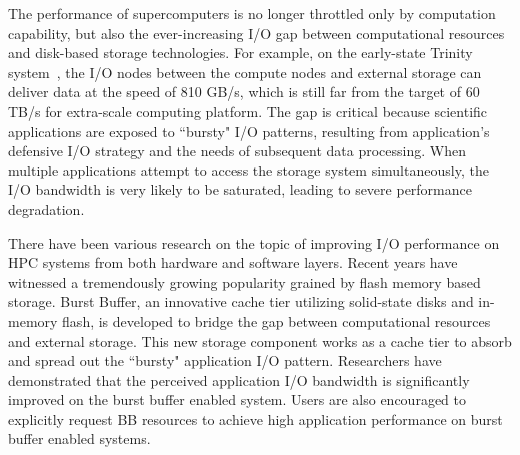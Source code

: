 The performance of supercomputers is no longer throttled only by computation capability,
but also the ever-increasing I/O gap
between computational resources and disk-based storage technologies.
For example, on the early-state Trinity system~\cite{TrinitySystem}, the I/O nodes between
the compute nodes and external storage can deliver data at  the speed of 810 GB/s, 
which is still far from the target of 60 TB/s for extra-scale computing platform\cite{Shalf:HPCCS:2010}.
The gap is critical because scientific applications are exposed to
``bursty" I/O patterns\cite{Carns:MSST:2011, Kim:PDSW:2010},
resulting from application's
defensive I/O strategy\cite{Latham:CSD:2012, Naik:ICPPW:2009, Dennis:CUG:2009}
and the needs of subsequent data processing.
When multiple applications attempt to access the storage system simultaneously,
the I/O bandwidth is very likely to be saturated, leading to severe performance degradation.


There have been various research on the topic of improving I/O performance on HPC systems from
both hardware and software layers.
Recent years have witnessed a tremendously growing popularity grained by flash memory  based storage.
Burst Buffer, an innovative cache tier utilizing solid-state disks and in-memory flash, 
is developed to bridge the gap between computational resources and external storage.
This new storage component works as a cache tier to absorb and spread out
the ``bursty" application I/O pattern\cite{Bent:HBP:2011, Grider:EXA:2010}.
Researchers\cite{Liu:MSST:2012} have demonstrated that the perceived application I/O
bandwidth is significantly improved on the burst buffer enabled system.
Users are also encouraged to explicitly request BB resources to achieve high application performance on burst buffer enabled systems\cite{apex-workflow}.

